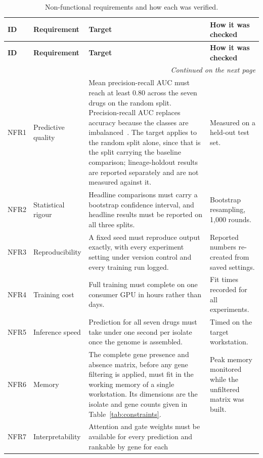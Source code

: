 {\small\setlength{\tabcolsep}{5pt}
\begin{longtable}{|l|>{\raggedright\arraybackslash}p{2.7cm}|>{\raggedright\arraybackslash}p{6.0cm}|>{\raggedright\arraybackslash}p{3.6cm}|}
\caption{Non-functional requirements and how each was verified.}
\label{tab:nonfuncreq}\\
\hline
\textbf{ID} & \textbf{Requirement} & \textbf{Target} & \textbf{How it was checked} \\
\hline
\endfirsthead
\hline
\textbf{ID} & \textbf{Requirement} & \textbf{Target} & \textbf{How it was checked} \\
\hline
\endhead
\hline
\multicolumn{4}{r}{\footnotesize\textit{Continued on the next page}}\\
\endfoot
\hline
\endlastfoot
NFR1 & Predictive quality &
Mean precision-recall AUC must reach at least 0.80 across the seven drugs on the random split.
Precision-recall AUC replaces accuracy because the classes are
imbalanced~\cite{saito2015, davis2006}. The target applies to the random split alone, since
that is the split carrying the baseline comparison; lineage-holdout results are reported
separately and are not measured against it. &
Measured on a held-out test set. \\
\hline
NFR2 & Statistical rigour &
Headline comparisons must carry a bootstrap confidence interval, and headline results must be
reported on all three splits. &
Bootstrap resampling, 1{,}000 rounds. \\
\hline
NFR3 & Reproducibility &
A fixed seed must reproduce output exactly, with every experiment setting under version control
and every training run logged. &
Reported numbers re-created from saved settings. \\
\hline
NFR4 & Training cost &
Full training must complete on one consumer GPU in hours rather than days. &
Fit times recorded for all experiments. \\
\hline
NFR5 & Inference speed &
Prediction for all seven drugs must take under one second per isolate once the genome is
assembled. &
Timed on the target workstation. \\
\hline
NFR6 & Memory &
The complete gene presence and absence matrix, before any gene filtering is applied, must fit
in the working memory of a single workstation. Its dimensions are the isolate and gene counts
given in Table~\ref{tab:constraints}. &
Peak memory monitored while the unfiltered matrix was built. \\
\hline
NFR7 & Interpretability &
Attention and gate weights must be available for every prediction and rankable by gene for each

\end{longtable}}
